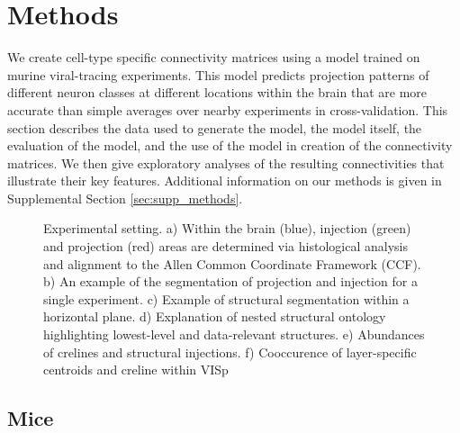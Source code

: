 \section{Methods}
We create cell-type specific connectivity matrices using a model trained on murine viral-tracing experiments.
This model predicts projection patterns of different neuron classes at different locations within the brain that are more accurate than simple averages over nearby experiments in cross-validation.
This section describes the data used to generate the model, the model itself, the evaluation of the model, and the use of the model in creation of the connectivity matrices.
We then give exploratory analyses of the resulting connectivities that illustrate their key features. 
Additional information on our methods is given in Supplemental Section \ref{sec:supp_methods}.
\newpage
\begin{figure}[H]
    \newline
    \caption{Experimental setting.  a) Within the brain (blue), injection (green) and projection (red) areas are determined via histological analysis and alignment to the Allen Common Coordinate Framework (CCF). b) An example of the segmentation of projection and injection for a single experiment. \label{fig:1b} c) Example of structural segmentation within a horizontal plane. d) Explanation of nested structural ontology highlighting lowest-level and data-relevant structures. e) Abundances of crelines and structural injections. f) Cooccurence of layer-specific centroids and creline within VISp}
    \label{fig:data}
\end{figure}

\newpage
\subsection{Mice}


